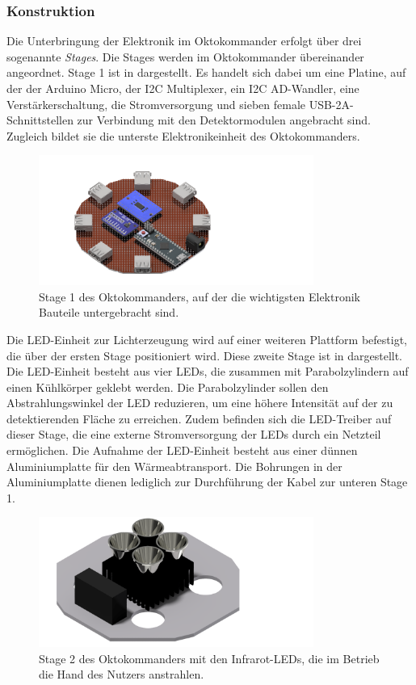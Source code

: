 \subsubsection*{Konstruktion}
Die Unterbringung der Elektronik im Oktokommander erfolgt über drei sogenannte \textit{Stages}. Die Stages werden im Oktokommander übereinander angeordnet. Stage 1 ist in  dargestellt. Es handelt sich dabei um eine Platine, auf der der Arduino Micro, der I2C Multiplexer, ein I2C AD-Wandler, eine Verstärkerschaltung, die Stromversorgung und sieben female USB-2A-Schnittstellen zur Verbindung mit den Detektormodulen angebracht sind. Zugleich bildet sie die unterste Elektronikeinheit des Oktokommanders.
\begin{figure}[H]
	\centering
	\includegraphics[width=9cm]{../CAD_Bilder/OktagonElektronik_Stage1_raytraced.png}
	\caption{Stage 1 des Oktokommanders, auf der die wichtigsten Elektronik Bauteile untergebracht sind.}
	\label{fig:OktoStage1}
\end{figure}
\noindent
Die LED-Einheit zur Lichterzeugung wird auf einer weiteren Plattform befestigt, die über der ersten Stage positioniert wird. Diese zweite Stage ist in  dargestellt. Die LED-Einheit besteht aus vier LEDs, die zusammen mit Parabolzylindern auf einen Kühlkörper geklebt werden. Die Parabolzylinder sollen den Abstrahlungswinkel der LED reduzieren, um eine höhere Intensität auf der zu detektierenden Fläche zu erreichen. Zudem befinden sich die LED-Treiber auf dieser Stage, die eine externe Stromversorgung der LEDs durch ein Netzteil ermöglichen. Die Aufnahme der LED-Einheit besteht aus einer dünnen Aluminiumplatte für den Wärmeabtransport. Die Bohrungen in der Aluminiumplatte dienen lediglich zur Durchführung der Kabel zur unteren Stage 1.
\begin{figure}[H]
	\centering
	\includegraphics[width=9cm]{../CAD_Bilder/OktagonElektronik_Stage2_raytraced.png}
	\caption{Stage 2 des Oktokommanders mit den Infrarot-LEDs, die im Betrieb die Hand des Nutzers anstrahlen.}
	\label{fig:OktoStage2}
\end{figure}
